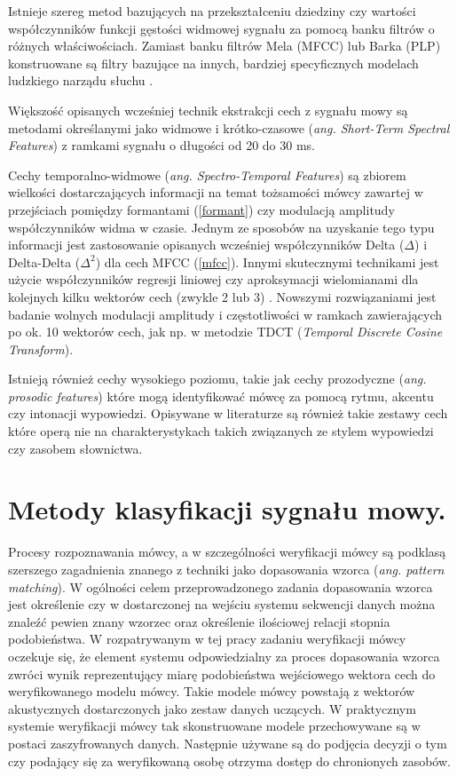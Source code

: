 Istnieje szereg metod bazujących na przekształceniu dziedziny czy wartości współczynników funkcji gęstości widmowej sygnału za pomocą banku filtrów o różnych właściwościach. Zamiast banku filtrów Mela (MFCC) lub Barka (PLP) konstruowane są filtry bazujące na innych, bardziej specyficznych modelach ludzkiego narządu słuchu \cite{fosr}.

Większość opisanych wcześniej technik ekstrakcji cech z sygnału mowy są metodami określanymi jako widmowe i krótko-czasowe (\textit{ang. Short-Term Spectral Features}) \cite{overview} z ramkami sygnału o długości od 20 do 30 ms.

Cechy temporalno-widmowe (\textit{ang. Spectro-Temporal Features}) \cite{overview} są zbiorem wielkości dostarczających informacji na temat tożsamości mówcy zawartej w przejściach pomiędzy formantami (\ref{formant}) czy modulacją amplitudy współczynników widma w czasie. Jednym ze sposobów na uzyskanie tego typu informacji jest zastosowanie opisanych wcześniej współczynników Delta ($\Delta$) i Delta-Delta ($\Delta^2$) dla cech MFCC (\ref{mfcc}). Innymi skutecznymi technikami jest użycie współczynników regresji liniowej  czy aproksymacji wielomianami dla kolejnych kilku wektorów cech (zwykle 2 lub 3) \cite{multidsp}. Nowszymi rozwiązaniami jest badanie wolnych modulacji amplitudy i częstotliwości w ramkach zawierających po ok. 10 wektorów cech, jak np. w metodzie TDCT (\textit{Temporal Discrete Cosine Transform}).

Istnieją również cechy wysokiego poziomu, takie jak cechy prozodyczne (\textit{ang. prosodic features}) które mogą identyfikować mówcę za pomocą rytmu, akcentu czy intonacji wypowiedzi. Opisywane w literaturze są również takie zestawy cech które operą nie na charakterystykach takich związanych ze stylem wypowiedzi czy zasobem słownictwa\cite{overview}.
\section{Metody klasyfikacji sygnału mowy.}
\label{featurematching}

Procesy rozpoznawania mówcy, a w szczególności weryfikacji mówcy są podklasą szerszego zagadnienia znanego z techniki jako dopasowania wzorca (\textit{ang. pattern matching}). W ogólności celem przeprowadzonego zadania dopasowania wzorca jest określenie czy w dostarczonej na wejściu systemu sekwencji danych można znaleźć pewien znany wzorzec oraz określenie ilościowej relacji stopnia podobieństwa. W rozpatrywanym w tej pracy zadaniu weryfikacji mówcy oczekuje się, że element systemu odpowiedzialny za proces dopasowania wzorca zwróci wynik reprezentujący miarę podobieństwa wejściowego wektora cech do weryfikowanego modelu mówcy. Takie modele mówcy powstają z wektorów akustycznych dostarczonych jako zestaw danych uczących. W praktycznym systemie weryfikacji mówcy tak skonstruowane modele przechowywane są w postaci zaszyfrowanych danych. Następnie używane są do podjęcia decyzji o tym czy podający się za weryfikowaną osobę otrzyma dostęp do chronionych zasobów.

